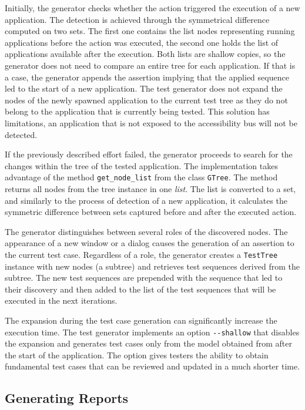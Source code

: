 Initially, the generator checks whether the action triggered the execution of a new application. The detection is achieved through the symmetrical difference computed on two sets. The first one contains the list nodes representing running applications before the action was executed, the second one holds the list of applications available after the execution. Both lists are shallow copies, so the generator does not need to compare an entire tree for each application. If that is a case, the generator appends the assertion implying that the applied sequence led to the start of a new application. The test generator does not expand the nodes of the newly spawned application to the current test tree as they do not belong to the application that is currently being tested. This solution has limitations, an application that is not exposed to the accessibility bus will not be detected.

If the previously described effort failed, the generator proceeds to search for the changes within the tree of the tested application. The implementation takes advantage of the method \texttt{get\_node\_list} from the class \texttt{GTree}. The method returns all nodes from the tree instance in one \textit{list}. The list is converted to a set, and similarly to the process of detection of a new application, it calculates the symmetric difference between sets captured before and after the executed action. 

The generator distinguishes between several roles of the discovered nodes. The appearance of a new window or a dialog causes the generation of an assertion to the current test case. Regardless of a role, the generator creates a \texttt{TestTree} instance with new nodes (a subtree) and retrieves test sequences derived from the subtree. The new test sequences are prepended with the sequence that led to their discovery and then added to the list of the test sequences that will be executed in the next iterations.

The expansion during the test case generation can significantly increase the execution time. The test generator implements an option \texttt{{-}{-}shallow} that disables the expansion and generates test cases only from the model obtained from after the start of the application. The option gives testers the ability to obtain fundamental test cases that can be reviewed and updated in a much shorter time.

\subsection{Generating Reports}


